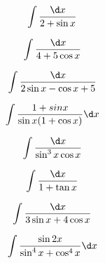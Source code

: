 \begin{question}
    \begin{equation*}
        \int \frac{\d x}{2 + \sin x}
    \end{equation*}
\end{question}

\begin{question}
    \begin{equation*}
        \int \frac{\d x}{4 + 5 \cos x}
    \end{equation*}
\end{question}

\begin{question}
    \begin{equation*}
        \int \frac{\d x}{2\sin x - \cos x + 5}
    \end{equation*}
\end{question}

\begin{question}
    \begin{equation*}
        \int \frac{1 + sin x}{\sin x (1 + \cos x)} \d x
    \end{equation*}
\end{question}

\begin{question}
    \begin{equation*}
        \int \frac{\d x}{\sin^3 x \cos x}
    \end{equation*}
\end{question}

\begin{question}
    \begin{equation*}
        \int \frac{\d x}{1 + \tan x}
    \end{equation*}
\end{question}

\begin{question}
    \begin{equation*}
        \int \frac{\d x}{3\sin x + 4\cos x}
    \end{equation*}
\end{question}

\begin{question}
    \begin{equation*}
        \int \frac{\sin 2x}{\sin^4 x + \cos^4 x} \d x
    \end{equation*}
\end{question}

